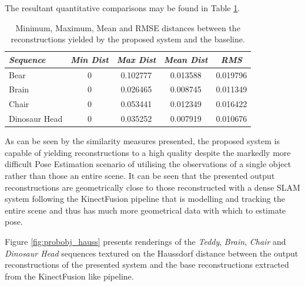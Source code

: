 The resultant quantitative comparisons may be found in Table \ref{tbl:probobj_hauss}.
\begin{table}[ht]
  \label{tbl:probobj_hauss}
  \centering
  \begin{tabular}{lcccc}
    \emph{Sequence} & \emph{Min Dist} & \emph{Max Dist} & \emph{Mean Dist} & \emph{RMS}\\
    \midrule
    \textsf{Bear} & 0 & 0.102777 & 0.013588 & 0.019796 \\
    \textsf{Brain} & 0 & 0.026465 & 0.008745 & 0.011349 \\
    \textsf{Chair} & 0 & 0.053441 & 0.012349 & 0.016422 \\
    \textsf{Dinosaur Head} & 0 & 0.035252 & 0.007919 & 0.010676
  \end{tabular}
  \caption[Probabilistic Object Reconstruction Hausdorff Distance]
  {Minimum, Maximum, Mean and RMSE distances between the reconstructions yielded by 
  the proposed system and the baseline.}
\end{table}

As can be seen by the similarity measures presented, the proposed system is capable of 
yielding reconstructions to a high quality despite the markedly more difficult Pose Estimation 
scenario of utilising the observations of a single object rather than those an entire scene. 
It can be seen that the presented output reconstructions are geometrically close to those 
reconstructed with a dense SLAM system \cite{Prisacariu2014} following the KinectFusion 
\cite{Newcombe2011} pipeline that is modelling and tracking the entire scene and thus has 
much more geometrical data with which to estimate pose.

Figure \ref{fig:probobj_hauss} presents renderings of the \textit{Teddy}, 
\textit{Brain}, \textit{Chair} and \textit{Dinosaur Head} sequences textured 
on the Haussdorf distance between the output reconstructions of the presented 
system and the base reconstructions extracted from the KinectFusion like pipeline.

